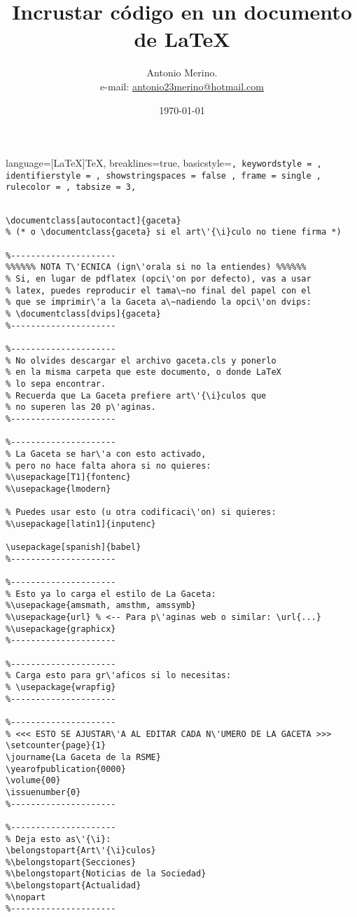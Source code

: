 \documentclass[11pt, a4paper]{article}
\title{Incrustar código en un documento de \LaTeX \\}
\author{Antonio Merino. \\ e-mail: 
\href{mailto:antonio23merino@hotmail.com}{antonio23merino@hotmail.com}}
\date{\today}
\begin{document}
\maketitle
\lstset
{
language=[LaTeX]TeX,
breaklines=true,
basicstyle=\tt\footnotesize ,
keywordstyle = \color{db!90},
identifierstyle = \color{dh!80},
showstringspaces = false ,
frame = single ,
rulecolor = \color{black!20},
tabsize = 3,
}

\begin{lstlisting}

\documentclass[autocontact]{gaceta}
% (* o \documentclass{gaceta} si el art\'{\i}culo no tiene firma *)

%---------------------
%%%%%% NOTA T\'ECNICA (ign\'orala si no la entiendes) %%%%%%
% Si, en lugar de pdflatex (opci\'on por defecto), vas a usar 
% latex, puedes reproducir el tama\~no final del papel con el 
% que se imprimir\'a la Gaceta a\~nadiendo la opci\'on dvips:
% \documentclass[dvips]{gaceta}
%---------------------

%---------------------
% No olvides descargar el archivo gaceta.cls y ponerlo 
% en la misma carpeta que este documento, o donde LaTeX 
% lo sepa encontrar.
% Recuerda que La Gaceta prefiere art\'{\i}culos que 
% no superen las 20 p\'aginas.
%---------------------

%---------------------
% La Gaceta se har\'a con esto activado, 
% pero no hace falta ahora si no quieres:
%\usepackage[T1]{fontenc}
%\usepackage{lmodern}

% Puedes usar esto (u otra codificaci\'on) si quieres:
%\usepackage[latin1]{inputenc}

\usepackage[spanish]{babel}
%---------------------

%---------------------
% Esto ya lo carga el estilo de La Gaceta:
%\usepackage{amsmath, amsthm, amssymb}
%\usepackage{url} % <-- Para p\'aginas web o similar: \url{...}
%\usepackage{graphicx}
%---------------------

%---------------------
% Carga esto para gr\'aficos si lo necesitas:
% \usepackage{wrapfig}
%---------------------

%---------------------
% <<< ESTO SE AJUSTAR\'A AL EDITAR CADA N\'UMERO DE LA GACETA >>>
\setcounter{page}{1} 
\journame{La Gaceta de la RSME}
\yearofpublication{0000}
\volume{00}
\issuenumber{0}
%---------------------

%---------------------
% Deja esto as\'{\i}:
\belongstopart{Art\'{\i}culos} 
%\belongstopart{Secciones} 
%\belongstopart{Noticias de la Sociedad} 
%\belongstopart{Actualidad} 
%\nopart
%---------------------


\end{lstlisting}
\end{document}
